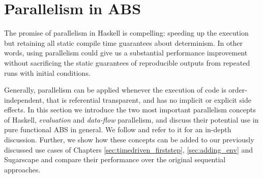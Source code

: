 \chapter{Parallelism in ABS}
\label{ch:parallelism_ABS}
The promise of parallelism in Haskell is compelling: speeding up the execution but retaining all static compile time guarantees about determinism. In other words, using parallelism could give us a substantial performance improvement without sacrificing the static guarantees of reproducible outputs from repeated runs with initial conditions.

Generally, parallelism can be applied whenever the execution of code is order-independent, that is referential transparent, and has no implicit or explicit side effects. In this section we introduce the two most important parallelism concepts of Haskell, \textit{evaluation} and \textit{data-flow} parallelism, and discuss their potential use in pure functional ABS in general. We follow \cite{marlow_parallel_2013} and refer to it for an in-depth discussion. Further, we show how these concepts can be added to our previously discussed use cases of Chapters \ref{sec:timedriven_firststep}, \ref{sec:adding_env} and Sugarscape and compare their performance over the original sequential approaches.





%
%




